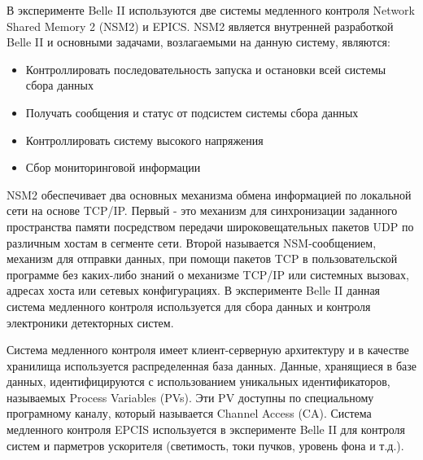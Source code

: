   В эксперименте Belle II используются две системы медленного контроля Network Shared Memory 2 (NSM2) и EPICS. NSM2 является внутренней разработкой Belle II и основными задачами, возлагаемыми на данную систему, являются:
\begin{itemize}
  \item Контроллировать последовательность запуска и остановки всей системы сбора данных
  \item Получать сообщения и статус от подсистем системы сбора данных
  \item Контроллировать систему высокого напряжения
  \item Сбор мониторинговой информации
\end{itemize}
NSM2 обеспечивает два основных механизма обмена информацией по локальной сети на основе TCP/IP. Первый - это механизм для синхронизации заданного пространства памяти посредством передачи широковещательных пакетов UDP по различным хостам в сегменте сети. Второй называется NSM-сообщением, механизм для отправки данных, при помощи пакетов TCP в пользовательской программе без каких-либо знаний о механизме TCP/IP или системных вызовах, адресах хоста или сетевых конфигурациях. В эксперименте Belle II данная система медленного контроля используется для сбора данных и контроля электроники детекторных систем.\par
  Система медленного контроля имеет клиент-серверную архитектуру и в качестве хранилища используется распределенная база данных. Данные, хранящиеся в базе данных, идентифицируются с использованием уникальных идентификаторов, называемых Process Variables (PVs). Эти PV доступны по специальному програмному каналу, который называется Channel Access (CA). Система медленного контроля EPCIS используется в эксперименте Belle II для контроля систем и парметров ускорителя (светимость, токи пучков, уровень фона и т.д.).
